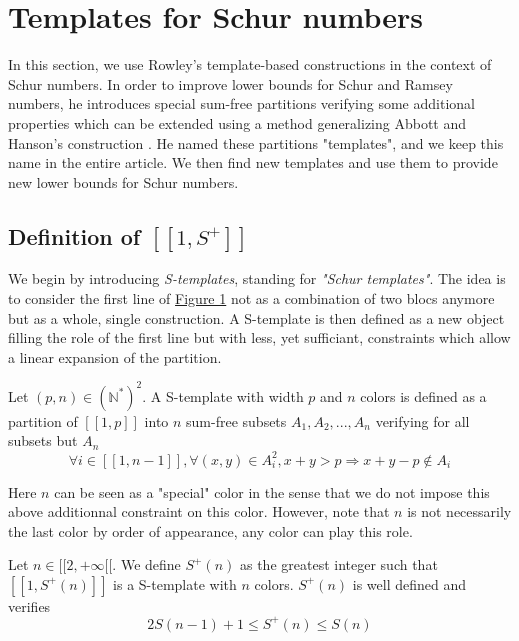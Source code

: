 \section{Templates for Schur numbers}
\label{Schur}

\qquad In this section, we use Rowley's template-based constructions \cite{RowleyRamsey} in the context of Schur 
numbers. In order to improve lower bounds for Schur and Ramsey numbers, he introduces special sum-free 
partitions verifying some additional properties which can be extended using a method generalizing Abbott and 
Hanson's construction \cite{AbbottHanson}. He named these partitions "templates", and we keep this name in 
the entire article. We then find new templates and use them to provide new lower bounds for Schur numbers.

\subsection{Definition of \( [\![ 1, S^+ ]\!] \)}

We begin by introducing \textit{S-templates}, standing for \textit{"Schur templates"}. The idea is to consider the first line
of \hyperref[figure:1]{Figure 1} not as a combination of two blocs anymore but as a whole, single construction. A S-template 
is then defined as a new object filling the role of the first line but with less, yet sufficiant, constraints which allow a linear 
expansion of the partition.

\begin{definition}
Let \((p,n) \in (\mathbb{N}^*)^2\). A S-template with width \(p\) and \(n\) colors is defined as a partition of 
\([\![1,p]\!]\) into \(n\) sum-free subsets \(A_1, A_2, ..., A_n\) verifying for all subsets but \(A_n\)
\[
\forall i \in [\![1, n-1]\!], \forall (x,y) \in A_i^2, x+y > p
\Longrightarrow x+y-p \notin A_i
\]
\end{definition}

Here \(n\) can be seen as a "special" color in the sense that we do not impose this above additionnal constraint on this color. 
However, note that \(n\) is not necessarily the last color by order of appearance, any color can play this role.


\begin{proposition}
	Let \(n \in [\![2, +\infty[\![\). We define \(S^+(n)\) as the greatest integer such that \( [\![1, S^+(n)]\!]\) is a S-template with \(n\) colors. 
	\(S^+(n)\) is well defined and verifies
	\[
	2S(n-1)+1 \leqslant S^+(n) \leqslant S(n)
	\]
\end{proposition}

